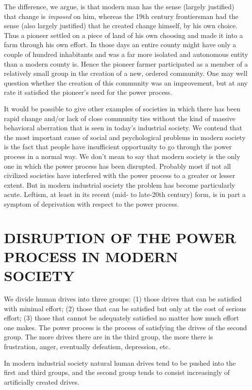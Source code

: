  The difference, we argue, is that modern man has the sense (largely justified) that change is {\em imposed} on him, whereas the 19th century frontiersman had the sense (also largely justified) that he created change himself, by his own choice. Thus a pioneer settled on a piece of land of his own choosing and made it into a farm through his own effort. In those days an entire county might have only a couple of hundred inhabitants and was a far more isolated and autonomous entity than a modern county is. Hence the pioneer farmer participated as a member of a relatively small group in the creation of a new, ordered community. One may well question whether the creation of this community was an improvement, but at any rate it satisfied the pioneer’s need for the power process.

 It would be possible to give other examples of societies in which there has been rapid change and/or lack of close community ties without the kind of massive behavioral aberration that is seen in today’s industrial society. We contend that the most important cause of social and psychological problems in modern society is the fact that people have insufficient opportunity to go through the power process in a normal way. We don’t mean to say that modern society is the only one in which the power process has been disrupted. Probably most if not all civilized societies have interfered with the power process to a greater or lesser extent. But in modern industrial society the problem has become particularly acute. Leftism, at least in its recent (mid- to late-20th century) form, is in part a symptom of deprivation with respect to the power process.

\chapter{DISRUPTION OF THE POWER PROCESS IN MODERN SOCIETY}

 We divide human drives into three groups: (1) those drives that can be satisfied with minimal effort; (2) those that can be satisfied but only at the cost of serious effort; (3) those that cannot be adequately satisfied no matter how much effort one makes. The power process is the process of satisfying the drives of the second group. The more drives there are in the third group, the more there is frustration, anger, eventually defeatism, depression, etc.

 In modern industrial society natural human drives tend to be pushed into the first and third groups, and the second group tends to consist increasingly of artificially created drives.

